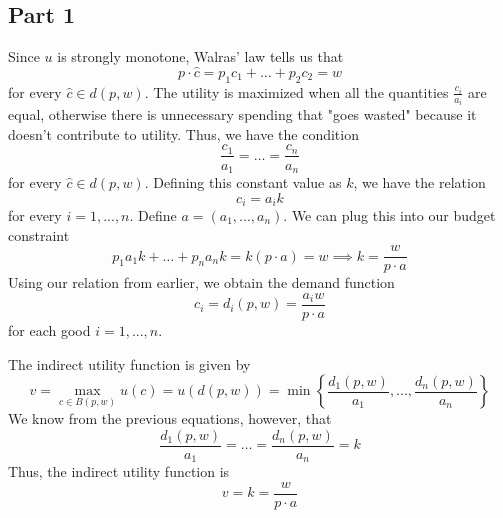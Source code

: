 \documentclass[12pt]{extarticle}
\numberwithin{table}{section}
\numberwithin{figure}{section}
\numberwithin{equation}{section}
\begin{document}
\subsection*{Part 1}
Since $u$ is strongly monotone, Walras' law tells us that
\begin{equation}
	p \cdot \hat c = p_1c_1 + \dots + p_2 c_2 = w
\end{equation}
for every $\hat c \in d(p, w)$.
The utility is maximized when all the quantities $\frac{c_i}{a_i}$ are equal,
otherwise there is unnecessary spending that "goes wasted" because it doesn't contribute to utility.
Thus, we have the condition
\begin{equation}
	\frac{c_1}{a_1} = \dots = \frac{c_n}{a_n}
\end{equation}
for every $\hat c \in d(p, w)$.
Defining this constant value as $k$, we have the relation
\begin{equation}
	c_i = a_i k
\end{equation}
for every $i = 1, ..., n$.
Define $a = (a_1, ..., a_n)$. We can plug this into our budget constraint
\begin{equation}
	p_1 a_1 k + \dots + p_n a_n k = k(p \cdot a) = w \implies k = \frac{w}{p \cdot a}
\end{equation}
Using our relation from earlier, we obtain the demand function
\begin{equation}
	c_i = d_i(p, w) = \frac{a_i w}{p \cdot a}
\end{equation}
for each good $i = 1, ..., n$.

The indirect utility function is given by
\begin{equation}
	v = \max_{c \in B(p, w)} u(c) = u(d(p, w)) = \min\left\{\frac{d_1(p, w)}{a_1}, ..., \frac{d_n(p, w)}{a_n}\right\}
\end{equation}
We know from the previous equations, however, that
\begin{equation}
	\frac{d_1(p, w)}{a_1} = \dots = \frac{d_n(p, w)}{a_n} = k
\end{equation}
Thus, the indirect utility function is
\begin{equation}
	v = k = \frac{w}{p \cdot a}
\end{equation}
\end{document}
